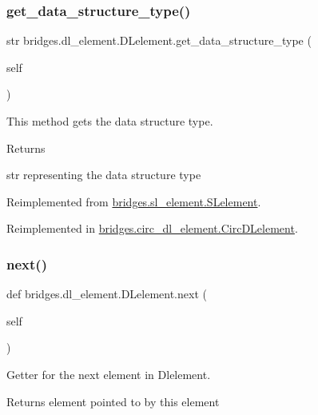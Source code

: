 \subsubsection{\texorpdfstring{get\_data\_structure\_type()}{get\_data\_structure\_type()}}
{\footnotesize\ttfamily  str bridges.\+dl\+\_\+element.\+D\+Lelement.\+get\+\_\+data\+\_\+structure\+\_\+type (\begin{DoxyParamCaption}\item[{}]{self }\end{DoxyParamCaption})}



This method gets the data structure type. 

\begin{DoxyReturn}{Returns}


str representing the data structure type 
\end{DoxyReturn}


Reimplemented from \mbox{\hyperlink{classbridges_1_1sl__element_1_1_s_lelement_ae6d1c0479d0ed763e1ea54f5d2f9a0eb}{bridges.\+sl\+\_\+element.\+S\+Lelement}}.



Reimplemented in \mbox{\hyperlink{classbridges_1_1circ__dl__element_1_1_circ_d_lelement_a86837fc443104b20589874000821afbd}{bridges.\+circ\+\_\+dl\+\_\+element.\+Circ\+D\+Lelement}}.

\mbox{\label{classbridges_1_1dl__element_1_1_d_lelement_a43077e810ec453c9cd512ba75819e28a}} 
\subsubsection{\texorpdfstring{next()}{next()}\hspace{0.1cm}{\footnotesize\ttfamily [1/2]}}
{\footnotesize\ttfamily def bridges.\+dl\+\_\+element.\+D\+Lelement.\+next (\begin{DoxyParamCaption}\item[{}]{self }\end{DoxyParamCaption})}



Getter for the next element in Dlelement. 

\begin{DoxyReturn}{Returns}
element pointed to by this element 
\end{DoxyReturn}


